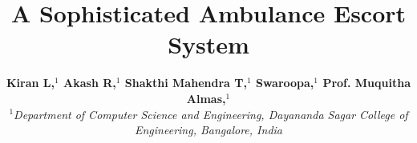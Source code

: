 \documentclass[conference]{IEEEtran}
\begin{document}
\title{\textbf {\huge A Sophisticated Ambulance Escort System }}
\author{{\textbf{\large Kiran L,$^1$ Akash R,$^1$ Shakthi Mahendra T,$^1$ 
  Swaroopa,$^1$ Prof. Muquitha Almas,$^1$ }}\\ 
  \textit{$^1$Department of Computer Science and Engineering, Dayananda Sagar College of Engineering, Bangalore, India} \\
  }


\end{document}
